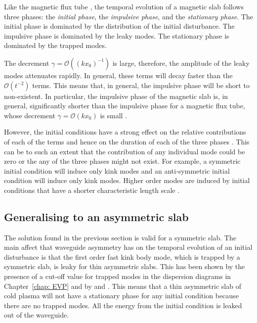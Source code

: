 \documentclass[12pt]{../style-files/ociamthesis}
\begin{document}
Like the magnetic flux tube \citep{rud_etal06b,ter_etal06}, the temporal evolution of a magnetic slab follows three phases: the \textit{initial phase}, the \textit{impulsive phase}, and the \textit{stationary phase}. The initial phase is dominated by the distribution of the initial disturbance. The impulsive phase is dominated by the leaky modes. The stationary phase is dominated by the trapped modes.

The decrement $\gamma = \mathcal{O}((kx_0)^{-1})$ is large, therefore, the amplitude of the leaky modes attenuates rapidly. In general, these terms will decay faster than the $\mathcal{O}(t^{-2})$ terms. This means that, in general, the impulsive phase will be short to non-existent. In particular, the impulsive phase of the magnetic slab is, in general, significantly shorter than the impulsive phase for a magnetic flux tube, whose decrement $\gamma = \mathcal{O}(kx_0)$ is small \citep{rud_etal06b}.

However, the initial conditions have a strong effect on the relative contributions of each of the terms and hence on the duration of each of the three phases \citep{ter_etal06,ter_etal07}. This can be to such an extent that the contribution of any individual mode could be zero or the any of the three phases might not exist. For example, a symmetric initial condition will induce only kink modes and an anti-symmetric initial condition will induce only kink modes. Higher order modes are induced by initial conditions that have a shorter characteristic length scale \citep{ter_etal07}.


\subsection{Generalising to an asymmetric slab}
The solution found in the previous section is valid for a symmetric slab. The main affect that waveguide asymmetry has on the temporal evolution of an initial disturbance is that the first order fast kink body mode, which is trapped by a symmetric slab, is leaky for thin asymmetric slabs. This has been shown by the presence of a cut-off value for trapped modes in the dispersion diagrams in Chapter~\ref{chap: EVP} and by \cite{all_etal17} and \cite{zsa_etal18}. This means that a thin asymmetric slab of cold plasma will not have a stationary phase for any initial condition because there are no trapped modes. All the energy from the initial condition is leaked out of the waveguide.
\end{document}
